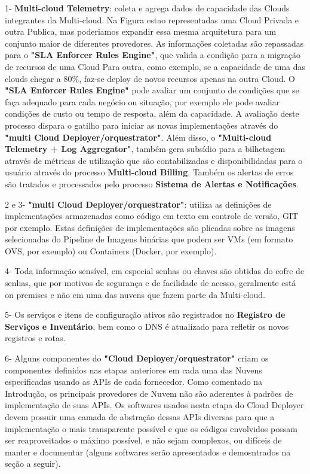 \documentclass[12pt]{article}
\begin{document}
	1- \textbf{Multi-cloud Telemetry}: coleta e agrega dados de capacidade das Clouds integrantes da Multi-cloud. Na Figura estao representadas uma Cloud Privada e outra Publica, mas poderiamos expandir essa mesma arquitetura para um conjunto maior de diferentes provedores. As informações coletadas são repassadas para o \textbf{"SLA Enforcer Rules Engine"}, que valida a condição para a migração de recursos de uma Cloud Para outra, como exemplo, se a capacidade de uma das clouds chegar a 80\%, faz-se deploy de novos recursos apenas na outra Cloud. O \textbf{"SLA Enforcer Rules Engine"} pode avaliar um conjunto de condições que se faça adequado para cada negócio ou situação, por exemplo ele pode avaliar condições de custo ou tempo de resposta, além da capacidade. A avaliação deste processo dispara o gatilho para iniciar as novas implementações através do \textbf{"multi Cloud Deployer/orquestrator"}. Além disso, o \textbf{"Multi-cloud Telemetry + Log Aggregator"}, também gera subsídio para a bilhetagem através de métricas de utilização que são contabilizadas e disponibilidadas para o usuário através do processo \textbf{Multi-cloud Billing}. Também os alertas de erros são tratados e processados pelo processo \textbf{Sistema de Alertas e Notificações}.
	
	2 e 3- \textbf{"multi Cloud Deployer/orquestrator"}: utiliza as definições de implementações armazenadas como código em texto em controle de versão, GIT por exemplo. Estas definições de implementações são plicadas sobre as imagens selecionadas do Pipeline de Imagens binárias que podem ser VMs (em formato OVS, por exemplo) ou Containers (Docker, por exemplo).
	
	4- Toda informação sensível, em especial senhas ou chaves são obtidas do cofre de senhas, que por motivos de segurança e de facilidade de acesso, geralmente está on premises e não em uma das nuvens que fazem parte da Multi-cloud.   
	
	5- Os serviços e itens de configuração ativos são registrados no \textbf{Registro de Serviços e Inventário}, bem como o DNS é atualizado para refletir os novos registros e rotas.
	
	6- Alguns componentes do \textbf{"Cloud Deployer/orquestrator"} criam os componentes definidos nas etapas anteriores em cada uma das Nuvens especificadas usando as APIs de cada fornecedor. Como comentado na Introdução, os principais provedores de Nuvem não são aderentes à padrões de implementação de suas APIs. Os softwares usados nesta etapa do Cloud Deployer devem possuir uma camada de abstração dessas APIs diversas para que a implementação o mais transparente possível e que os códigos envolvidos possam ser reaproveitados o máximo possível, e não sejam complexos, ou difíceis de manter e documentar (alguns softwares serão apresentados e demosntrados na seção a seguir).  
	
\end{document}
